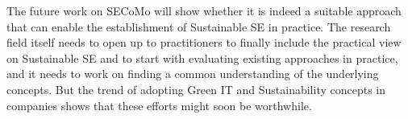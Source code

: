\documentclass[oribibl]{llncs}
\begin{document}
The future work on SECoMo will show whether it is indeed a suitable approach that can enable the establishment of Sustainable SE in practice. The research field itself needs to open up to practitioners to finally include the practical view on Sustainable SE and to start with evaluating existing approaches in practice, and it needs to work on finding a common understanding of the underlying concepts. But the trend of adopting Green IT and Sustainability concepts in companies shows that these efforts might soon be worthwhile.




%
%

%
\end{document}

